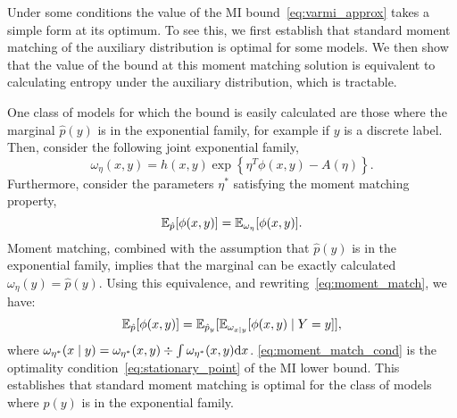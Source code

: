 

Under some conditions the value of the MI
bound~\eqref{eq:varmi_approx} takes a simple form at its optimum.  To
see this, we first establish that standard moment matching of the
auxiliary distribution is optimal for some models.  We then show that
the value of the bound at this moment matching solution is equivalent
to calculating entropy under the auxiliary distribution, which is
tractable.

One class of models for which the bound is easily calculated are those
where the marginal $\hat{p}(y)$ is in the exponential family, for
example if $y$ is a discrete label.  Then, consider the following
joint exponential family,
\[
  \omega_{\eta}(x,y) = h(x,y)\exp\left\{ \eta^T \phi(x,y) - A(\eta)
    \right\}.
\]
Furthermore, consider the parameters $\eta^*$ satisfying the moment
matching property,
\begin{equation}\label{eq:moment_match}
  \mathbb{E}_{\hat{p}}[ \phi(x,y) ] = \mathbb{E}_{\omega_{\eta}}[ \phi(x,y) ].
\end{equation}
Moment matching, combined with the assumption that $\hat{p}(y)$ is in
the exponential family, implies that the marginal can be exactly
calculated $\omega_{\eta}(y) = \hat{p}(y)$.  Using this equivalence,
and rewriting~\eqref{eq:moment_match}, we have:
\begin{equation}\label{eq:moment_match_cond}
  \mathbb{E}_{\hat{p}}[ \phi(x,y) ] = \mathbb{E}_{\hat{p}_y}[ \mathbb{E}_{\omega_{x\mid y}}[ \phi(x,y)
      \mid Y=y ] ],
\end{equation}
where $\omega_{\eta^{*}}(x\mid y)
= \omega_{\eta^{*}}(x,y) \div \int \omega_{\eta^{*}}(x,y) \mathrm{d}
x$.  \EQN\eqref{eq:moment_match_cond} is the optimality
condition~\eqref{eq:stationary_point} of the MI lower bound.  This
establishes that standard moment matching is optimal for the class of
models where $\hat{p}(y)$ is in the exponential family.

